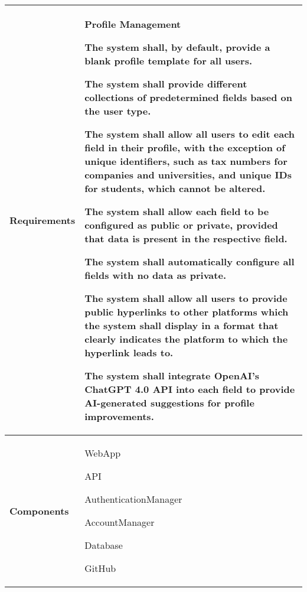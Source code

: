 \begin{table}[ht]
    \centering
    \renewcommand{\arraystretch}{1.5} %
    \begin{tabular}{|C{0.3\textwidth}|L{0.65\textwidth}|} %
        \hline
        \textbf{Requirements} & 
        \textbf{Profile Management} \par
        [FR13] The system shall, by default, provide a blank profile template for
        all users. \par
       [FR14] The system shall provide different collections of predetermined fields
        based on the user type. \par
        [FR15] The system shall allow all users to edit each field in their profile,
        with the exception of unique identifiers, such as tax numbers for
        companies and universities, and unique IDs for students, which
        cannot be altered. \par
        [FR16] The system shall allow each field to be configured as public or
        private, provided that data is present in the respective field. \par
        [FR17] The system shall automatically configure all fields with no data as
        private. \par
        [FR18] The system shall allow all users to provide public hyperlinks to
        other platforms which the system shall display in a format that
        clearly indicates the platform to which the hyperlink leads to. \par
        [FR19] The system shall integrate OpenAI’s ChatGPT 4.0 API into each
        field to provide AI-generated suggestions for profile improvements. \\
        \hline
        \textbf{Components} & 
        WebApp \par
        API \par
        AuthenticationManager \par
        AccountManager \par
        Database \par
        GitHub \\
        \hline
    \end{tabular}
\end{table}


